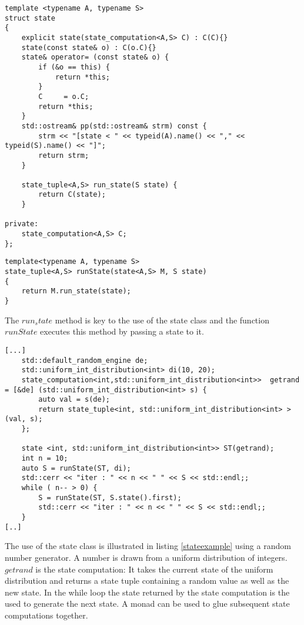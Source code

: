 \documentclass[12pt,fleqn]{article}
\begin{document}
%
%
%
\begin{minipage}{\linewidth}
\begin{lstlisting}[caption=state, label=state]
template <typename A, typename S>
struct state 
{
	explicit state(state_computation<A,S> C) : C(C){}
	state(const state& o) : C(o.C){}
	state& operator= (const state& o) {
		if (&o == this) {
			return *this;
		}
		C     = o.C;
		return *this;
	} 
	std::ostream& pp(std::ostream& strm) const {
		strm << "[state < " << typeid(A).name() << "," << typeid(S).name() << "]";
		return strm;
	}

	state_tuple<A,S> run_state(S state) {
		return C(state);
	}
	
private:
	state_computation<A,S> C;
};
\end{lstlisting}
\end{minipage}
%
%
%


%
%
%
\begin{minipage}{\linewidth}
\begin{lstlisting}[caption=runState, label=runstate]
template<typename A, typename S>
state_tuple<A,S> runState(state<A,S> M, S state)
{
	return M.run_state(state);
}
\end{lstlisting}
\end{minipage}
%
%
%

%
%
The $run_state$ method is key to the use of the state class and the function $runState$ executes this method by passing a state to it.

%
%
%
\begin{minipage}{\linewidth}
\begin{lstlisting}[caption=example of the use of the state class, label=stateexample]
[...]
	std::default_random_engine de;
	std::uniform_int_distribution<int> di(10, 20);
	state_computation<int,std::uniform_int_distribution<int>>  getrand = [&de] (std::uniform_int_distribution<int> s) {
		auto val = s(de);
		return state_tuple<int, std::uniform_int_distribution<int> >(val, s);
	}; 

	state <int, std::uniform_int_distribution<int>> ST(getrand);
	int n = 10;
	auto S = runState(ST, di);
	std::cerr << "iter : " << n << " " << S << std::endl;;
	while ( n-- > 0) {
		S = runState(ST, S.state().first);
		std::cerr << "iter : " << n << " " << S << std::endl;;
	}
[..]
\end{lstlisting}
\end{minipage}
%
%
%

The use of the state class is illustrated in listing \ref{stateexample} using a random number generator.
A number is drawn from a uniform distribution of integers.
$getrand$ is the state computation: It takes the current state of the uniform distribution and returns a state tuple containing a 
random value as well as the new state.
In the while loop the state returned by the state computation is the used to generate the next state. 
A monad can be used to glue subsequent state computations together. 
\end{document}
